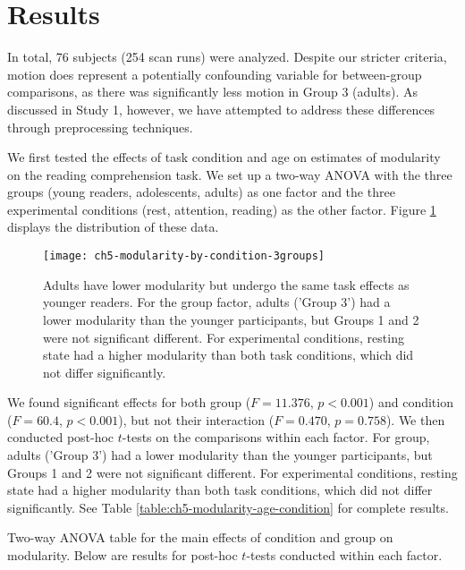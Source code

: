 \section{Results}

In total, 76 subjects (254 scan runs) were analyzed. Despite our stricter criteria, motion does represent a potentially confounding variable for between-group comparisons, as there was significantly less motion in Group 3 (adults). As discussed in Study 1, however, we have attempted to address these differences through preprocessing techniques.

We first tested the effects of task condition and age on estimates of modularity on the reading comprehension task. We set up a two-way ANOVA with the three groups (young readers, adolescents, adults) as one factor and the three experimental conditions (rest, attention, reading) as the other factor. Figure \ref{fig:ch5-modularity-by-condition-3groups} displays the distribution of these data. 

\begin{figure}[t]
	\centering
	\texttt{[image: ch5-modularity-by-condition-3groups]}
    \caption[Adults have lower modularity but undergo the same task effects as younger readers.]{Adults have lower modularity but undergo the same task effects as younger readers. For the group factor, adults ('Group 3') had a lower modularity than the younger participants, but Groups 1 and 2 were not significant different. For experimental conditions, resting state had a higher modularity than both task conditions, which did not differ significantly.}
	\label{fig:ch5-modularity-by-condition-3groups}
\end{figure}

We found significant effects for both group ($F = 11.376$, $p < 0.001$) and condition ($F = 60.4$, $p < 0.001$), but not their interaction ($F=0.470$, $p = 0.758$). We then conducted post-hoc $t$-tests on the comparisons within each factor. For group, adults ('Group 3') had a lower modularity than the younger participants, but Groups 1 and 2 were not significant different. For experimental conditions, resting state had a higher modularity than both task conditions, which did not differ significantly. See Table \ref{table:ch5-modularity-age-condition} for complete results. 

\begin{table}[t]
	\renewcommand{\tabcolsep}{0.09cm}
	\centering
	
	\caption[Statistical results for the effects of condition and group on modularity.]{Two-way ANOVA table for the main effects of condition and group on modularity. Below are results for post-hoc $t$-tests conducted within each factor.}
	\label{table:ch5-modularity-age-condition}
\end{table}

